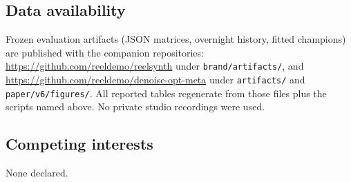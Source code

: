 \subsection{Data availability}
\label{sec:data-availability}
Frozen evaluation artifacts (JSON matrices, overnight history, fitted champions) are published with the companion repositories:
\url{https://github.com/reeldemo/reelsynth} under \texttt{brand/artifacts/}, and
\url{https://github.com/reeldemo/denoise-opt-meta} under \texttt{artifacts/} and \texttt{paper/v6/figures/}.
All reported tables regenerate from those files plus the scripts named above.
No private studio recordings were used.

\subsection{Competing interests}
\label{sec:competing}
None declared.

